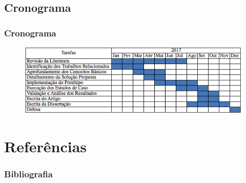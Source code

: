 \documentclass[hyperref={pdfpagelabels=false}]{beamer}
\begin{document}
\subsection{Cronograma}
\begin{frame}
	\frametitle{Cronograma}
		    \begin{figure}
 		   		\centering
	        	\includegraphics[scale=.6]{img/CronogramaDissertacao.png}
   			\end{figure}
 
\end{frame}

\section {Referências}
\begin{frame}[allowframebreaks]
\frametitle{Bibliografia}
    
    \footnotesize{  }
\end{frame}
\end{document}
